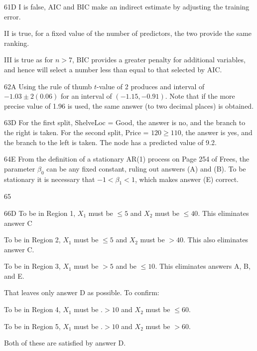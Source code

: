\begin{solution}{61}{D}
I is false, AIC and BIC make an indirect estimate by adjusting the training error.

II is true, for a fixed value of the number of predictors, the two provide the same ranking.

III is true as for $n > 7$, BIC provides a greater penalty for additional variables, and hence will select a number less than equal to that selected by AIC.
\end{solution}

\begin{solution}{62}{A}
Using the rule of thumb $t$-value of 2 produces and interval of $-1.03 \pm 2(0.06)$ for an interval of $(-1.15, -0.91)$. Note that if the more precise value of 1.96 is used, the same answer (to two decimal places) is obtained.
\end{solution}

\begin{solution}{63}{D}
For the first split, ShelveLoc = Good, the answer is no, and the branch to the right is taken. For the second split, Price = $120 \geqslant 110$, the answer is yes, and the branch to the left is taken. The node has a predicted value of 9.2.
\end{solution}

\begin{solution}{64}{E}
From the definition of a stationary AR(1) process on Page 254 of Frees, the parameter $\beta_0$ can be any fixed constant, ruling out answers (A) and (B). To be stationary it is necessary that $-1 < \beta_1 < 1$, which makes answer (E) correct.
\end{solution}

\begin{solution}{65}{}
\deleted
\end{solution}

\begin{solution}{66}{D}
To be in Region 1, $X_1$ must be $\leqslant 5$ and $X_2$ must be $\leqslant 40$.
This eliminates answer C

To be in Region 2, $X_1$ must be $\leqslant 5$ and $X_2$ must be $> 40$. This also eliminates answer C.

To be in Region 3, $X_1$ must be $> 5$ and be $\leqslant 10$. This eliminates answers A, B, and E.

That leaves only answer D as possible. To confirm:

To be in Region 4, $X_1$ must be .$> 10$ and $X_2$ must be $\leqslant 60$.

To be in Region 5, $X_1$ must be .$> 10$ and $X_2$ must be $> 60$.

Both of these are satisfied by answer D.
\end{solution}

